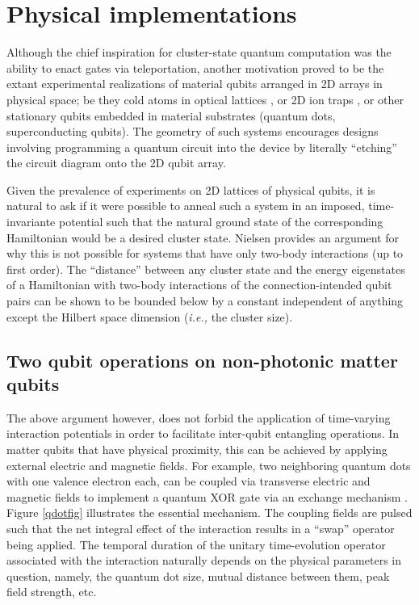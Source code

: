 \documentclass[twocolumn]{Styles/IEEEtran11}
\newcommand{\ie}{{\it i.e., }}
\begin{document}
\section{Physical implementations}

Although the chief inspiration for cluster-state quantum computation was the ability to enact gates via teleportation, another motivation proved to be the extant experimental realizations of material qubits arranged in 2D arrays in physical space; be they cold atoms in optical lattices \cite{bloch2003}, or 2D ion traps \cite{rabchuk2006}, or other stationary qubits embedded in material substrates (quantum dots, superconducting qubits). The geometry of such systems encourages designs involving programming a quantum circuit into the device by literally ``etching'' the circuit diagram onto the 2D qubit array.

Given the prevalence of experiments on 2D lattices of physical qubits, it is natural to ask if it were possible to anneal such a system in an imposed, time-invariante potential such that the natural ground state of the corresponding Hamiltonian would be a desired cluster state. Nielsen \cite{nielsen2006cluster} provides an argument for why this is not possible for systems that have only two-body interactions (up to first order). The ``distance'' between any cluster state and the energy eigenstates of a Hamiltonian with two-body interactions of the connection-intended qubit pairs can be shown to be bounded below by a constant independent of anything except the Hilbert space dimension (\ie the cluster size).

\subsection{Two qubit operations on non-photonic matter qubits}

The above argument however, does not forbid the application of time-varying interaction potentials in order to facilitate inter-qubit entangling operations. In matter qubits that have physical proximity, this can be achieved by applying external electric and magnetic fields. For example, two neighboring quantum dots with one valence electron each, can be coupled via transverse electric and magnetic fields to implement a quantum XOR gate via an exchange mechanism \cite{divincenzo1999}. Figure \ref{qdotfig} illustrates the essential mechanism. The coupling fields are pulsed such that the net integral effect of the interaction results in a ``swap'' operator being applied. The temporal duration of the unitary time-evolution operator associated with the interaction naturally depends on the physical parameters in question, namely, the quantum dot size, mutual distance between them, peak field strength, etc.
\end{document}
